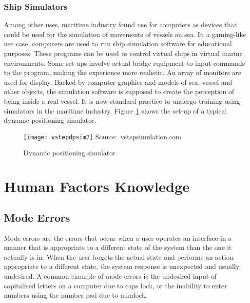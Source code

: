 \subsubsection{Ship Simulators}
Among other uses, maritime industry found use for computers as devices that could be used for the simulation of movements of vessels on sea. In a gaming-like use case, computers are used to run ship simulation software for educational purposes. These programs can be used to control virtual ships in virtual marine environments. Some set-ups involve actual bridge equipment to input commands to the program, making the experience more realistic. An array of monitors are used for display. Backed by computer graphics and models of sea, vessel and other objects, the simulation software is supposed to create the perception of being inside a real vessel. It is now standard practice to undergo training using simulators in the maritime industry. Figure \ref{fig:vstepdpsim} shows the set-up of a typical dynamic positioning simulator. 

\begin{figure}
	\centering
	\caption{Dynamic positioning simulator}
	\texttt{[image: vstepdpsim2]}
	\hbox{\small Source: vstepsimulation.com}
	\label{fig:vstepdpsim}
\end{figure}


\section{Human Factors Knowledge}
\label{sec:humanfactors}
\subsection{Mode Errors}
Mode errors are the errors that occur when a user operates an interface in a manner that is appropriate to a different state of the system than the one it actually is in. When the user forgets the actual state and performs an action appropriate to a different state, the system response is unexpected and usually undesired. A common example of mode errors is the undesired input of capitalised letters on a computer due to caps lock, or the inability to enter numbers using the number pad due to numlock. 

